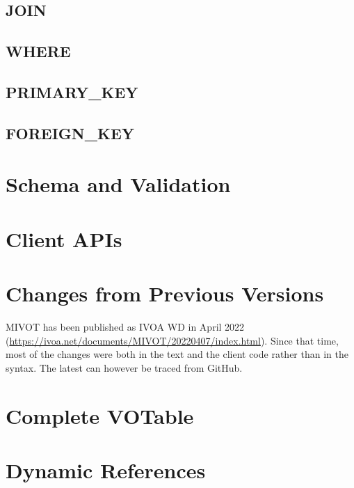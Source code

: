 \documentclass[11pt,a4paper]{ivoa}
\begin{document}
\subsection{JOIN} \label{JOIN}

\FloatBarrier

\subsection{WHERE} \label{WHERE}

\FloatBarrier

\subsection{PRIMARY\_KEY} \label{PRIMARY_KEY}

\FloatBarrier

\subsection{FOREIGN\_KEY} \label{FOREIGN_KEY}

\FloatBarrier



\pagebreak
\section{Schema and Validation}


\pagebreak
\section{Client APIs}


\section{Changes from Previous Versions}
MIVOT has been published as IVOA WD in April 2022 (\url{https://ivoa.net/documents/MIVOT/20220407/index.html}).
Since that time, most of the changes were both in the text and the client code rather than in the syntax. 
The latest can however be traced from GitHub.

\pagebreak

\appendix 

\section{Complete VOTable} \label{appendix_A}


\section{Dynamic References}\label{appen_dynref}

\end{document}
